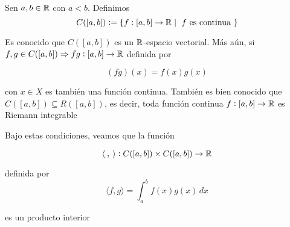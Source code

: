 \begin{eg}
    Sen $a,b \in \mathbb{R}$ con $a < b$. Definimos 
    \begin{equation*}
        C([a,b]) := \{ f: [a,b] \to \mathbb{R} \mid \text{ $f$ es continua }\}
    \end{equation*}

    Es conocido que $ C([a,b])$ es un $\mathbb{R}$-espacio vectorial. Más aún, si $f,g \in C([a,b]) \Rightarrow fg : [a,b] \to \mathbb{R}$ definida por

    \begin{equation*}
        (fg)(x) = f(x)g(x)
    \end{equation*}

    con $x \in X$ es también una función continua. También es bien conocido que $ C([a,b]) \subseteq  R([a,b])$, es decir, toda función continua $f:[a,b] \to \mathbb{R}$ es Riemann integrable

    Bajo estas condiciones, veamos que la función

    \begin{equation*}
        \langle \: , \: \rangle : C([a,b]) \times C([a,b]) \to \mathbb{R}
    \end{equation*}

    definida por
    \begin{equation*}
         \langle f , g \rangle = \int_{a}^{b} f(x)g(x) \, dx
    \end{equation*}

    es un producto interior 
\end{eg}

